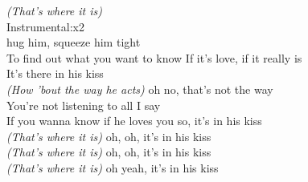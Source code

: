 \emph{(That's where it is)}\\
Instrumental:\hrulefill{}\hrulefill{}\hrulefill{}\hrulefill{}\hrulefill x2\\
hug him, squeeze him tight\\
To find out what you want to know If it's love, if it really is\\
It's there in his kiss\\
\emph{(How 'bout the way he acts)} oh no, that's not the way\\
You're not listening to all I say\\
If you wanna know if he loves you so, it's in his kiss\\
\emph{(That's where it is)} oh, oh, it's in his kiss\\
\emph{(That's where it is)} oh, oh, it's in his kiss\\
\emph{(That's where it is)} oh yeah, it's in his kiss\\
\hrulefill{}\hrulefill{}

